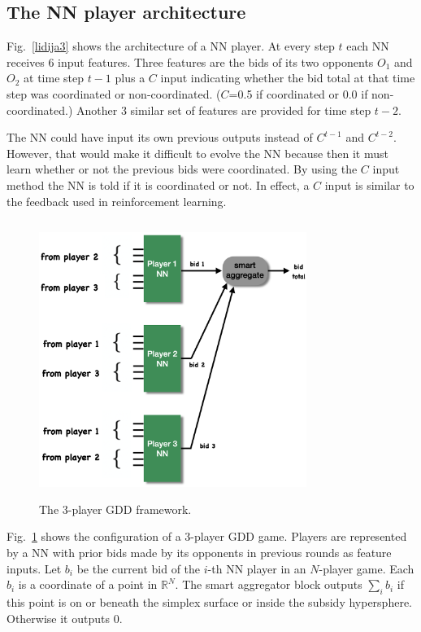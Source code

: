 \documentclass[journal]{IEEEtran} %
\begin{document}
\subsection{The NN player architecture}

Fig.~\ref{lidija3} shows the architecture of a NN player. At every step $t$ each NN receives 6 input features. Three features are the bids of its two opponents $O_1$ and $O_2$ at time step $t-1$ plus a $C$ input indicating whether the bid total at that time step was coordinated or non-coordinated. ($C$=0.5 if coordinated or 0.0 if non-coordinated.) Another 3 similar set of features are provided for time step $t-2$.  

The NN could have input its own previous outputs instead of $C^{t-1}$ and $C^{t-2}$. However, that would make it difficult to evolve the NN because then it must learn whether or not the previous bids were coordinated. By using the $C$ input method the NN is told if it is coordinated or not. In effect, a $C$ input is similar to the feedback used in reinforcement learning. 


\begin{figure}[tbp]
\centerline{\includegraphics[width=8.7cm,height=9cm]{AMY2.png}}
\caption{The 3-player GDD framework. }
\label{lidija4}
\end{figure}

Fig.~\ref{lidija4} shows the configuration of a 3-player GDD game. Players are represented by a NN with prior bids made by its opponents in previous rounds as feature inputs. Let $b_i$ be the current bid of the $i$-th NN player in an $N$-player game. Each $b_i$ is a coordinate of a point in $\mathbb{R}^N$. The smart aggregator block outputs $\sum_i b_i$ if this point is on or beneath the simplex surface or inside the subsidy hypersphere. Otherwise it outputs 0.
\end{document}
